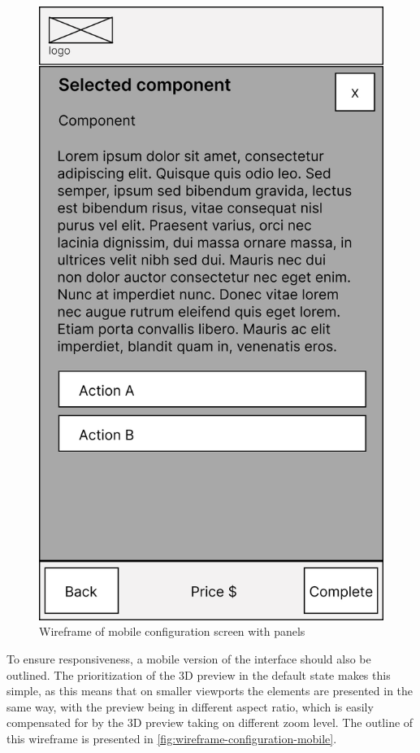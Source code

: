 \begin{figure}[h]
\begin{minipage}{0.35\textwidth}
        \centering
        \includegraphics[width=\linewidth]{images/wireframe_configuration_mobile_panels.png}
        \caption{Wireframe of mobile configuration screen with panels}
        \label{fig:wireframe-configuration-panel-mobile}
    \end{minipage}
\end{figure}

To ensure responsiveness, a mobile version of the interface should also be outlined. The prioritization of the 3D preview in the default state makes this simple, as this means that on smaller viewports the elements are presented in the same way, with the preview being in different aspect ratio, which is easily compensated for by the 3D preview taking on different zoom level. The outline of this wireframe is presented in \autoref{fig:wireframe-configuration-mobile}.

